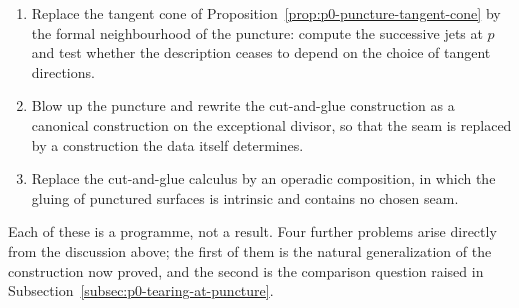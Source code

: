 \begin{enumerate}
  \item Replace the tangent cone of Proposition~\ref{prop:p0-puncture-tangent-cone}
  by the formal neighbourhood of the puncture: compute the successive jets at
  $p$ and test whether the description ceases to depend on the choice of tangent
  directions.
  \item Blow up the puncture and rewrite the cut-and-glue construction as a
  canonical construction on the exceptional divisor, so that the seam is
  replaced by a construction the data itself determines.
  \item Replace the cut-and-glue calculus by an operadic composition, in which
  the gluing of punctured surfaces is intrinsic and contains no chosen seam.
\end{enumerate}

Each of these is a programme, not a result.  Four further problems arise
directly from the discussion above; the first of them is the natural
generalization of the construction now proved, and the second is the comparison
question raised in Subsection~\ref{subsec:p0-tearing-at-puncture}.

